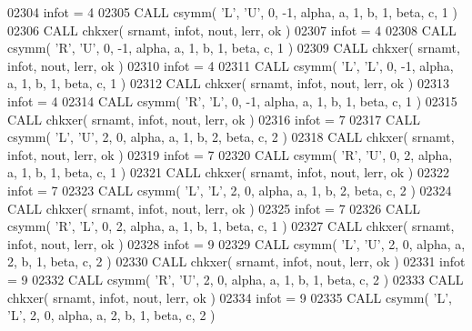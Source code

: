 \begin{DoxyCode}
02304       infot = 4
02305       \textcolor{keyword}{CALL }csymm( \textcolor{stringliteral}{'L'}, \textcolor{stringliteral}{'U'}, 0, -1, alpha, a, 1, b, 1, beta, c, 1 )
02306       \textcolor{keyword}{CALL }chkxer( srnamt, infot, nout, lerr, ok )
02307       infot = 4
02308       \textcolor{keyword}{CALL }csymm( \textcolor{stringliteral}{'R'}, \textcolor{stringliteral}{'U'}, 0, -1, alpha, a, 1, b, 1, beta, c, 1 )
02309       \textcolor{keyword}{CALL }chkxer( srnamt, infot, nout, lerr, ok )
02310       infot = 4
02311       \textcolor{keyword}{CALL }csymm( \textcolor{stringliteral}{'L'}, \textcolor{stringliteral}{'L'}, 0, -1, alpha, a, 1, b, 1, beta, c, 1 )
02312       \textcolor{keyword}{CALL }chkxer( srnamt, infot, nout, lerr, ok )
02313       infot = 4
02314       \textcolor{keyword}{CALL }csymm( \textcolor{stringliteral}{'R'}, \textcolor{stringliteral}{'L'}, 0, -1, alpha, a, 1, b, 1, beta, c, 1 )
02315       \textcolor{keyword}{CALL }chkxer( srnamt, infot, nout, lerr, ok )
02316       infot = 7
02317       \textcolor{keyword}{CALL }csymm( \textcolor{stringliteral}{'L'}, \textcolor{stringliteral}{'U'}, 2, 0, alpha, a, 1, b, 2, beta, c, 2 )
02318       \textcolor{keyword}{CALL }chkxer( srnamt, infot, nout, lerr, ok )
02319       infot = 7
02320       \textcolor{keyword}{CALL }csymm( \textcolor{stringliteral}{'R'}, \textcolor{stringliteral}{'U'}, 0, 2, alpha, a, 1, b, 1, beta, c, 1 )
02321       \textcolor{keyword}{CALL }chkxer( srnamt, infot, nout, lerr, ok )
02322       infot = 7
02323       \textcolor{keyword}{CALL }csymm( \textcolor{stringliteral}{'L'}, \textcolor{stringliteral}{'L'}, 2, 0, alpha, a, 1, b, 2, beta, c, 2 )
02324       \textcolor{keyword}{CALL }chkxer( srnamt, infot, nout, lerr, ok )
02325       infot = 7
02326       \textcolor{keyword}{CALL }csymm( \textcolor{stringliteral}{'R'}, \textcolor{stringliteral}{'L'}, 0, 2, alpha, a, 1, b, 1, beta, c, 1 )
02327       \textcolor{keyword}{CALL }chkxer( srnamt, infot, nout, lerr, ok )
02328       infot = 9
02329       \textcolor{keyword}{CALL }csymm( \textcolor{stringliteral}{'L'}, \textcolor{stringliteral}{'U'}, 2, 0, alpha, a, 2, b, 1, beta, c, 2 )
02330       \textcolor{keyword}{CALL }chkxer( srnamt, infot, nout, lerr, ok )
02331       infot = 9
02332       \textcolor{keyword}{CALL }csymm( \textcolor{stringliteral}{'R'}, \textcolor{stringliteral}{'U'}, 2, 0, alpha, a, 1, b, 1, beta, c, 2 )
02333       \textcolor{keyword}{CALL }chkxer( srnamt, infot, nout, lerr, ok )
02334       infot = 9
02335       \textcolor{keyword}{CALL }csymm( \textcolor{stringliteral}{'L'}, \textcolor{stringliteral}{'L'}, 2, 0, alpha, a, 2, b, 1, beta, c, 2 )

\end{DoxyCode}
